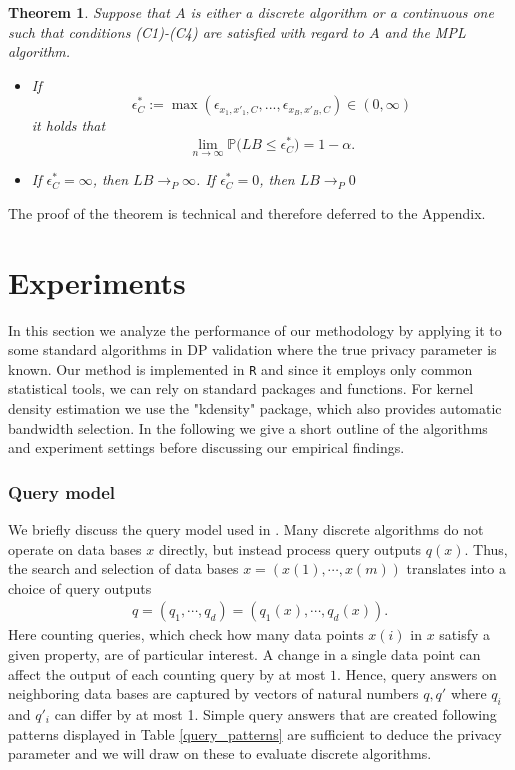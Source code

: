\documentclass[conference]{IEEEtran}
\newtheorem{theorem}{Theorem}
\begin{document}
\begin{theorem} \label{theorem_3} 
Suppose that $A$ is either a discrete algorithm or a continuous one such that conditions (C1)-(C4) are satisfied with regard to $A$ and the MPL algorithm. 
\begin{itemize}
    \item[i)] If 
    $$
    \epsilon_{C}^* := \max(\epsilon_{x_1,x'_1,C},...,\epsilon_{x_B,x'_B,C}) \in (0, \infty)
    $$
    it holds that
\begin{equation} \label{Eq_level}
    \lim_{n \to \infty} \mathbb{P}\Big( LB \le \epsilon_{C}^* \Big) = 1-\alpha.
\end{equation}
    \item[ii)] If $ \epsilon_{C}^* = \infty$, then $LB \to_P \infty$.  If $ \epsilon_{C}^* = 0$, then $LB \to_P 0$
\end{itemize}
\end{theorem}
The proof of the theorem is technical and therefore deferred to the Appendix.


\section{Experiments} \label{Sec_5} 

In this section we analyze the performance of our methodology by applying it to some standard algorithms 
in DP validation where the true privacy parameter is known. 
Our method is implemented in \texttt{R} and since it employs only common statistical tools, we can rely on standard packages and functions.
For kernel density estimation we use the "kdensity" package, which also provides automatic bandwidth selection. 
In the following we give a short outline of the algorithms and experiment settings before discussing our empirical findings.



\subsubsection*{\textbf{Query model}}
We briefly discuss the query model used in \cite{StatDP}. Many discrete algorithms do not operate on data bases $x$ directly, but instead process query outputs $q(x)$. Thus, the search and selection of data bases $x = (x(1), \cdots, x(m))$ translates into a choice of query outputs 
\begin{align*}
    q = (q_1, \cdots, q_d) = (q_1(x), \cdots, q_d(x)).
\end{align*}
Here counting queries, which check how many data points $x(i)$ in $x$ satisfy a given property, are of particular interest. A change in a single data point can affect the output of each counting query by at most $1$. Hence, query answers on neighboring data bases are captured by vectors of natural numbers $q,q'$ where $q_i$ and $q'_i$ can differ by at most 1. Simple query answers that are created following patterns displayed in Table \ref{query_patterns} are sufficient to deduce the privacy parameter \cite{StatDP} and we will draw on these to evaluate discrete algorithms. 
\end{document}

